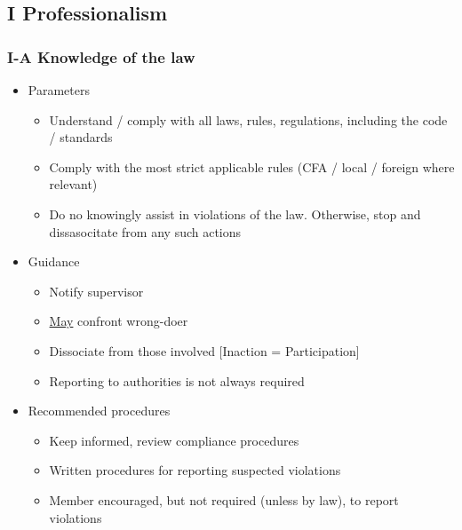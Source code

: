 \documentclass[../notes_compiled.tex]{subfiles}
\begin{document}
\subsection{I Professionalism}
\subsubsection{I-A Knowledge of the law}
\begin{itemize}
\item Parameters
\begin{itemize}
\item Understand / comply with all laws, rules, regulations, including the code / standards
\item Comply with the most strict applicable rules (CFA / local / foreign where relevant)
\item Do no knowingly assist in violations of the law. Otherwise, stop and dissasocitate from any such actions
\end{itemize}
\item Guidance
\begin{itemize}
\item Notify supervisor
\item \underline{May} confront wrong-doer
\item Dissociate from those involved [Inaction = Participation]
\item Reporting to authorities is not always required
\end{itemize}
\item Recommended procedures
\begin{itemize}
\item Keep informed, review compliance procedures
\item Written procedures for reporting suspected violations
\item Member encouraged, but not required (unless by law), to report violations
\end{itemize}
\end{itemize}
\end{document}
